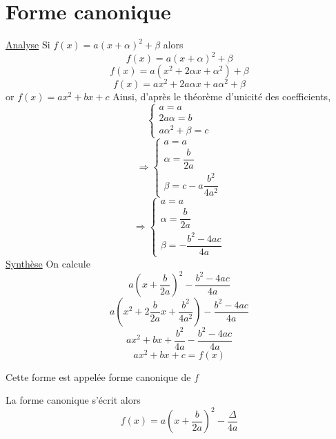 \section{Forme canonique}
\newline
\begin{preuve}
\underline{Analyse} \newline
Si $f(x) = a(x+\alpha)^2 + \beta$
alors 
$$f(x) = a(x+\alpha)^2 + \beta$$
$$f(x) = a(x^2 + 2\alpha x + \alpha^2)+\beta$$
$$f(x) = ax^2 + 2a\alpha x + a \alpha^2 + \beta$$
or $f(x) = ax^2 + bx + c$\newline
Ainsi, d'après le théorème d'unicité des coefficients, 
$$\left\{ \begin{array}{l}
  a = a\\
  2a\alpha =  b \\
  a \alpha^2 + \beta = c
\end{array} \right.$$
$$\Rightarrow \left\{ \begin{array}{l}
  a = a\\
  \alpha =  \dfrac{b}{2a} \\
  \beta = c - a\dfrac{b^2}{4a^2}
\end{array} \right.$$
$$\Rightarrow \left\{ \begin{array}{l}
  a = a\\
  \alpha =  \dfrac{b}{2a} \\
  \beta = -\dfrac{b^2-4ac}{4a}
\end{array} \right.$$
\underline{Synthèse} \newline
On calcule 
$$a\left(x+\dfrac{b}{2a}\right)^2 - \dfrac{b^2-4ac}{4a}$$
$$a\left(x^2 + 2\dfrac{b}{2a}x + \dfrac{b^2}{4a^2}\right) -\dfrac{b^2-4ac}{4a}$$
$$ax^2 + bx + \dfrac{b^2}{4a} - \dfrac{b^2-4ac}{4a}$$
$$ax^2+bx +c = f(x)$$
\end{preuve}
\begin{remarque}
Cette forme est appelée forme canonique de $f$
\end{remarque}
\newline
\begin{remarque}
La forme canonique s'écrit alors
$$f(x) = a\left(x+\dfrac{b}{2a}\right)^2 - \dfrac{\Delta}{4a}$$
\end{remarque}
